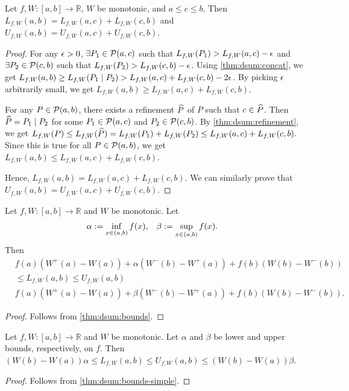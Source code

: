 \documentclass[a4paper,12pt,fleqn]{article}
\begin{document}
\begin{lemma}
\label{thm:dint:concat}
Let $f, W: [a, b] \to \mathbb{R}$, $W$ be monotonic, and $a \le c \le b$.
Then $L_{f,W}(a, b) = L_{f,W}(a, c) + L_{f,W}(c, b)$
and $U_{f,W}(a, b) = U_{f,W}(a, c) + U_{f,W}(c, b)$.
\end{lemma}
\begin{proof}
For any $\epsilon > 0$,
$\exists P_1 \in \mathcal{P}(a, c)$ such that $L_{f,W}(P_1) > L_{f,W}(a, c) - \epsilon$
and $\exists P_2 \in \mathcal{P}(c, b)$ such that $L_{f,W}(P_2) > L_{f,W}(c, b) - \epsilon$.
Using \cref{thm:dsum:concat}, we get
$L_{f,W}(a, b) \ge L_{f,W}(P_1 \mid P_2) > L_{f,W}(a, c) + L_{f,W}(c, b) - 2\epsilon$.
By picking $\epsilon$ arbitrarily small, we get $L_{f,W}(a, b) \ge L_{f,W}(a, c) + L_{f,W}(c, b)$.

For any $P \in \mathcal{P}(a, b)$, there exists a refinement $\widehat{P}$ of $P$ such that $c \in \widehat{P}$.
Then $\widehat{P} = P_1 \mid P_2$ for some $P_1 \in \mathcal{P}(a, c)$ and $P_2 \in \mathcal{P}(c, b)$.
By \cref{thm:dsum:refinement}, we get
$L_{f,W}(P) \le L_{f,W}(\widehat{P}) = L_{f,W}(P_1) + L_{f,W}(P_2) \le L_{f,W}(a, c) + L_{f,W}(c, b)$.
Since this is true for all $P \in \mathcal{P}(a, b)$, we get
$L_{f,W}(a, b) \le L_{f,W}(a, c) + L_{f,W}(c, b)$.

Hence, $L_{f,W}(a, b) = L_{f,W}(a, c) + L_{f,W}(c, b)$.
We can similarly prove that $U_{f,W}(a, b) = U_{f,W}(a, c) + U_{f,W}(c, b)$.
\end{proof}

\begin{lemma}
\label{thm:dint:bounds}
Let $f, W: [a, b] \to \mathbb{R}$ and $W$ be monotonic. Let
\begin{align*}
\alpha &:= \inf_{x \in (a, b)} f(x),
& \beta &:= \sup_{x \in (a, b)} f(x).
\end{align*}
Then
\begin{align*}
& f(a)(W^+(a)-W(a)) + \alpha(W^-(b) - W^+(a)) + f(b)(W(b) - W^-(b))
\\ &\le L_{f,W}(a, b) \le U_{f,W}(a, b)
\\ & f(a)(W^+(a)-W(a)) + \beta(W^-(b) - W^+(a)) + f(b)(W(b) - W^-(b)).
\end{align*}
\end{lemma}
\begin{proof}
Follows from \cref{thm:dsum:bounds}.
\end{proof}

\begin{lemma}
\label{thm:dint:bounds-simple}
Let $f, W: [a, b] \to \mathbb{R}$ and $W$ be monotonic.
Let $\alpha$ and $\beta$ be lower and upper bounds, respectively, on $f$.
Then $(W(b)-W(a))\alpha \le L_{f,W}(a, b) \le U_{f,W}(a, b) \le (W(b)-W(a))\beta$.
\end{lemma}
\begin{proof}
Follows from \cref{thm:dsum:bounds-simple}.
\end{proof}
\end{document}
